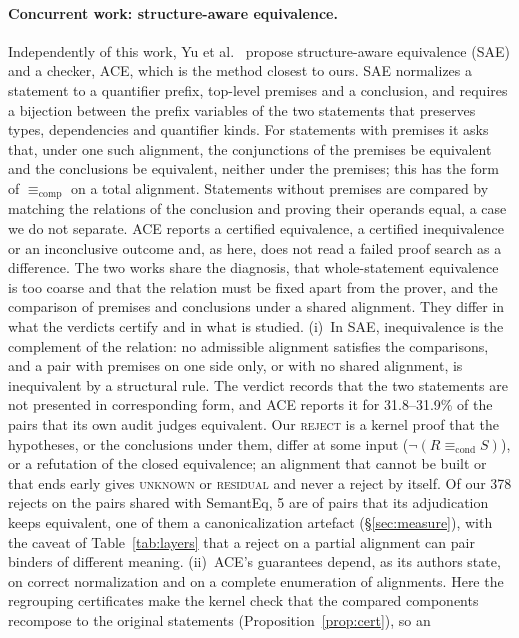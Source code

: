 \documentclass[10pt]{article}
\theoremstyle{definition}
\newcommand{\Econd}{\mathrel{\equiv_{\mathrm{cond}}}}
\newcommand{\Ecomp}{\mathrel{\equiv_{\mathrm{comp}}}}
\newcommand{\V}[1]{\textsc{#1}}
\begin{document}
\paragraph{Concurrent work: structure-aware equivalence.} Independently of this work, Yu et
al.~\cite{ace} propose structure-aware equivalence (SAE) and a checker, ACE, which is the method
closest to ours. SAE normalizes a statement to a quantifier prefix, top-level premises and a
conclusion, and requires a bijection between the prefix variables of the two statements that
preserves types, dependencies and quantifier kinds. For statements with premises it asks that,
under one such alignment, the conjunctions of the premises be equivalent and the conclusions be
equivalent, neither under the premises; this has the form of $\Ecomp$ on a total alignment.
Statements without premises are compared by matching the relations of the conclusion and proving
their operands equal, a case we do not separate. ACE reports a certified equivalence, a certified
inequivalence or an inconclusive outcome and, as here, does not read a failed proof search as a
difference. The two works share the diagnosis, that whole-statement equivalence is too coarse and
that the relation must be fixed apart from the prover, and the comparison of premises and
conclusions under a shared alignment. They differ in what the verdicts certify and in what is
studied.
(i)~In SAE, inequivalence is the complement of the relation: no admissible alignment satisfies
the comparisons, and a pair with premises on one side only, or with no shared alignment, is
inequivalent by a structural rule. The verdict records that the two statements are not
presented in corresponding form, and ACE reports it for 31.8--31.9\% of the pairs that its own
audit judges equivalent. Our \V{reject} is a kernel proof that the hypotheses, or the conclusions under
them, differ at some input ($\neg(R\Econd S)$), or a refutation of the closed equivalence; an
alignment that cannot be built or that ends early gives \V{unknown} or \V{residual} and never a
reject by itself. Of our 378 rejects on the pairs shared with SemantEq, 5 are of pairs that its
adjudication keeps equivalent, one of them a canonicalization artefact (\S\ref{sec:measure}),
with the caveat of Table~\ref{tab:layers} that a reject on a partial alignment can pair binders
of different meaning.
(ii)~ACE's guarantees depend, as its authors state, on correct normalization and on a complete
enumeration of alignments. Here the regrouping certificates make the kernel check that the
compared components recompose to the original statements (Proposition~\ref{prop:cert}), so an
\end{document}
